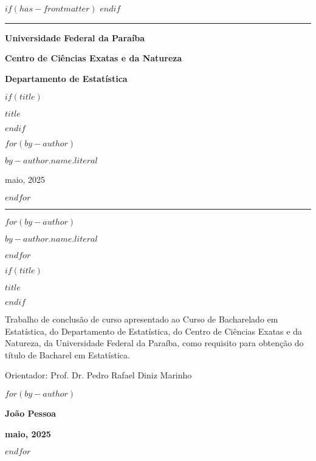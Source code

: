 $if(has-frontmatter)$
$endif$
\cleardoublepage
\thispagestyle{empty}
{\centering
\noindent\rule{\textwidth}{0.5pt}

\vspace{2ex}

{\Large\bfseries Universidade Federal da Paraíba \par}
\vspace{1ex}
{\Large\bfseries Centro de Ciências Exatas e da Natureza \par}
\vspace{1ex}
{\Large\bfseries Departamento de Estatística \par}

\vfill

$if(title)$
{\large\bfseries $title$ \par}
$endif$

\vfill

$for(by-author)$
{\large $by-author.name.literal$ \par}
\vfill
{\normalsize maio, 2025 \par}
$endfor$


\noindent\rule{\textwidth}{0.5pt}

\newpage
\thispagestyle{empty}

$for(by-author)$
{\normalsize\bfseries $by-author.name.literal$ \par}
$endfor$

\vfill

$if(title)$
{\large\bfseries $title$ \par}
$endif$

\vfill

\hfill \parbox{8cm}{\normalsize{Trabalho de conclusão de curso apresentado ao Curso de Bacharelado em Estatística, do Departamento de Estatística, do Centro de Ciências Exatas e da Natureza, da Universidade Federal da Paraíba, como requisito para obtenção do título de Bacharel em Estatística.}}

\vfill

{\normalsize Orientador: Prof. Dr. Pedro Rafael Diniz Marinho}

\vfill

$for(by-author)$
{\normalsize\bfseries João Pessoa \par}
{\normalsize\bfseries maio, 2025 \par}
$endfor$

}
